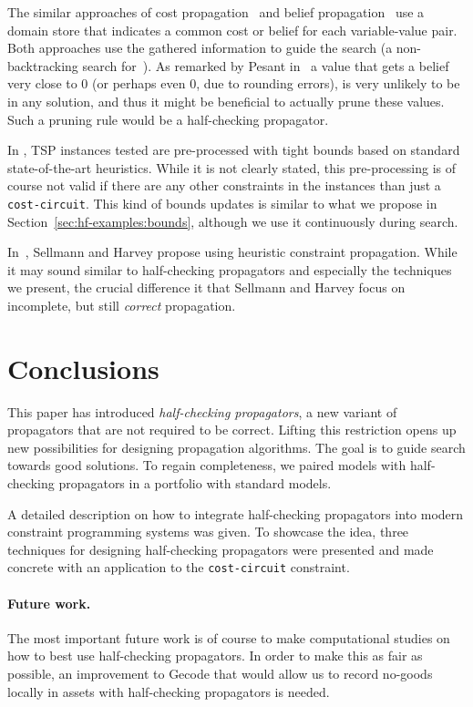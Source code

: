 \documentclass[runningheads]{llncs}
\newcommand{\cons}[1]{\texttt{#1}}
\begin{document}
The similar approaches of cost propagation~\cite{GroheWedelin08} and
belief propagation~\cite{Pesant19} use a domain store that
indicates a common cost or belief for each variable-value pair. Both
approaches use the gathered information to guide the search (a
non-backtracking search for~\cite{GroheWedelin08}).  As remarked by
Pesant in~\cite{Pesant19} a value that gets a belief very close to
0 (or perhaps even 0, due to rounding errors), is very unlikely to be
in any solution, and thus it might be beneficial to actually prune these
values. Such a pruning rule would be a half-checking propagator.

In \cite{Benchimol12}, TSP instances tested are pre-processed with
tight bounds based on standard state-of-the-art heuristics. While it
is not clearly stated, this pre-processing is of course not valid if
there are any other constraints in the instances than just a
\cons{cost-circuit}. This kind of bounds updates is similar to what we
propose in Section~\ref{sec:hf-examples:bounds}, although we use it
continuously during search.

In~\cite{SellmannHarvey02}, Sellmann and Harvey propose using heuristic
constraint propagation. While it may sound similar to half-checking
propagators and especially the techniques we present, the crucial
difference it that Sellmann and Harvey focus on incomplete, but still
\emph{correct} propagation. 

\section{Conclusions}
\label{sec:conclusions}

This paper has introduced \emph{half-checking propagators}, a new
variant of propagators that are not required to be correct. Lifting
this restriction opens up new possibilities for designing propagation
algorithms. The goal is to guide search towards good solutions. To
regain completeness, we paired models with half-checking propagators
in a portfolio with standard models.

A detailed description on how to integrate half-checking propagators
into modern constraint programming systems was given. To showcase the
idea, three techniques for designing half-checking propagators were
presented and made concrete with an application to the
\cons{cost-circuit} constraint. 

\paragraph{Future work.} The most important future work is of course
to make computational studies on how to best use half-checking
propagators. In order to make this as fair as possible, an improvement
to Gecode that would allow us to record no-goods locally in assets
with half-checking propagators is needed.
\end{document}
